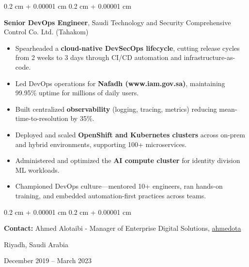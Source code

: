 \documentclass[10pt, letterpaper]{article}
\newenvironment{highlights}{
    \begin{itemize}[
        topsep=0.10 cm,
        parsep=0.10 cm,
        partopsep=0pt,
        itemsep=0pt,
        leftmargin=0.4 cm + 10pt
    ]
}{
    \end{itemize}
} %
\newenvironment{onecolentry}{
    \begin{adjustwidth}{
        0.2 cm + 0.00001 cm
    }{
        0.2 cm + 0.00001 cm
    }
}{
    \end{adjustwidth}
} %
\newenvironment{twocolentry}[2][]{
    \onecolentry
    \def\secondColumn{#2}
    \setcolumnwidth{\fill, 4.5 cm}
    \begin{paracol}{2}
}{
    \switchcolumn \raggedleft \secondColumn
    \end{paracol}
    \endonecolentry
} %
\let\hrefWithoutArrow\href
\renewcommand{\href}[2]{\hrefWithoutArrow{#1}{\ifthenelse{\equal{#2}{}}{ }{#2 }\raisebox{.15ex}{\footnotesize \faExternalLink*}}}
\begin{document}
    \begin{twocolentry}{
        Riyadh, Saudi Arabia

        December 2019 – March 2023
    }
        \textbf{Senior DevOps Engineer}, Saudi Technology and Security Comprehensive Control Co. Ltd. (Tahakom)
        \begin{highlights}
            \item Spearheaded a \textbf{cloud-native DevSecOps lifecycle}, cutting release cycles from 2 weeks to 3 days through CI/CD automation and infrastructure-as-code.
            \item Led DevOps operations for \textbf{Nafadh (www.iam.gov.sa)}, maintaining 99.95\% uptime for millions of daily users.
            \item Built centralized \textbf{observability} (logging, tracing, metrics) reducing mean-time-to-resolution by 35\%.
            \item Deployed and scaled \textbf{OpenShift and Kubernetes clusters} across on-prem and hybrid environments, supporting 100+ microservices.
            \item Administered and optimized the \textbf{AI compute cluster} for identity division ML workloads.
            \item Championed DevOps culture—mentored 10+ engineers, ran hands-on training, and embedded automation-first practices across teams.
        \end{highlights}

        \begin{onecolentry}
            \textbf{Contact:} Ahmed Alotaibi - Manager of Enterprise Digital Solutions,
            \mbox{\hrefWithoutArrow{https://www.linkedin.com/in/ahmedota/}{{\footnotesize\faLinkedinIn}\hspace*{0.13cm}ahmedota}}%
        \end{onecolentry}
    \end{twocolentry}

    \vspace{0.2 cm}
\end{document}
